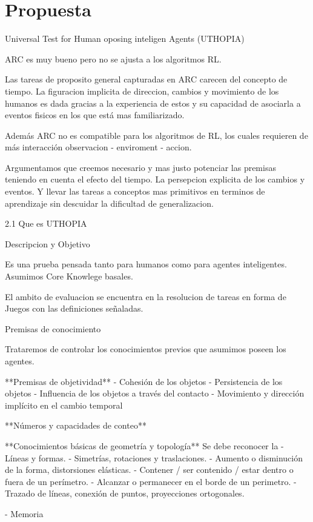 \chapter{Propuesta}\label{chapter:proposal}


Universal Test for Human oposing inteligen Agents (UTHOPIA)

ARC es muy bueno pero no se ajusta a los algoritmos RL.

Las tareas de proposito general capturadas en ARC carecen del concepto de tiempo. La figuracion implicita de direccion, cambios y movimiento de los humanos es dada gracias a la experiencia de estos y su capacidad de asociarla a eventos fisicos en los que está mas familiarizado.

Además ARC no es compatible para los algoritmos de RL, los cuales requieren de más interacción observacion - enviroment - accion.

Argumentamos que creemos necesario y mas justo potenciar las premisas teniendo en cuenta el efecto del tiempo. La persepcion explicita de los cambios y eventos. Y llevar las tareas a conceptos mas primitivos en terminos de aprendizaje sin descuidar la dificultad de generalizacion.

2.1 Que es UTHOPIA

 Descripcion y Objetivo

Es una prueba pensada tanto para humanos como para agentes inteligentes. Asumimos Core Knowlege basales.

El ambito de evaluacion se encuentra en la resolucion de tareas en forma de Juegos con las definiciones señaladas.

Premisas de conocimiento 

Trataremos de controlar los conocimientos previos que asumimos poseen los agentes.

**Premisas de objetividad**
- Cohesión de los objetos
- Persistencia de los objetos
- Influencia de los objetos a través del contacto
- Movimiento y dirección implícito en el cambio temporal

**Números y capacidades de conteo**

**Conocimientos básicas de geometría y topología**
Se debe reconocer la 
- Líneas y formas.
- Simetrías, rotaciones y traslaciones.
- Aumento o disminución de la forma, distorsiones elásticas.
- Contener / ser contenido / estar dentro o fuera de un perímetro.
- Alcanzar o permanecer en el borde de un perimetro.
- Trazado de líneas, conexión de puntos, proyecciones ortogonales.

- Memoria